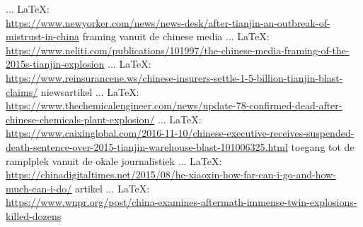 \begin{thebibliography}{99}
     ... \LaTeX:\\ \url{https://www.newyorker.com/news/news-desk/after-tianjin-an-outbreak-of-mistrust-in-china}
    framing vanuit de chinese media
     ... \LaTeX:\\ \url{https://www.neliti.com/publications/101997/the-chinese-media-framing-of-the-2015s-tianjin-explosion}
     ... \LaTeX:\\ \url{https://www.reinsurancene.ws/chinese-insurers-settle-1-5-billion-tianjin-blast-claims/}
    niewsartikel
     ... \LaTeX:\\ \url{https://www.thechemicalengineer.com/news/update-78-confirmed-dead-after-chinese-chemicals-plant-explosion/}
     ... \LaTeX:\\ \url{https://www.caixinglobal.com/2016-11-10/chinese-executive-receives-suspended-death-sentence-over-2015-tianjin-warehouse-blast-101006325.html}
    toegang tot de ramplplek vanuit de okale journalistiek
     ... \LaTeX:\\ \url{https://chinadigitaltimes.net/2015/08/he-xiaoxin-how-far-can-i-go-and-how-much-can-i-do/}
    artikel
     ... \LaTeX:\\ \url{https://www.wnpr.org/post/china-examines-aftermath-immense-twin-explosions-killed-dozens}


\end{thebibliography}
